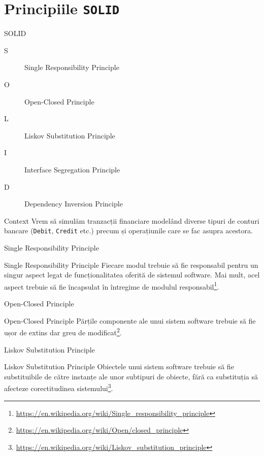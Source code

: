 \documentclass[presentation]{beamer}
\begin{document}
\section{Principiile \texttt{SOLID}}
\label{sec:org23a6d92}
\begin{frame}[label={sec:org90a5503}]{SOLID}
\begin{description}
\item[{S}] Single Responsibility Principle
\item[{O}] Open-Closed Principle
\item[{L}] Liskov Substitution Principle
\item[{I}] Interface Segregation Principle
\item[{D}] Dependency Inversion Principle
\end{description}
\end{frame}
\begin{frame}[label={sec:orgca02fb6},fragile]{Context}
 Vrem să simulăm tranzacții financiare modelând diverse tipuri de conturi bancare (\texttt{Debit}, \texttt{Credit} etc.) precum și operațiunile care se fac asupra acestora.
\end{frame}
\begin{frame}[label={sec:org30d808a}]{Single Responsibility Principle}
\begin{block}{Single Responsibility Principle}
Fiecare modul trebuie să fie responsabil pentru un singur aspect legat de funcționalitatea oferită de sistemul software. Mai mult, acel aspect trebuie să fie încapsulat în întregime de modulul responsabil\footnote{\url{https://en.wikipedia.org/wiki/Single\_responsibility\_principle}}.
\end{block}
\end{frame}
\begin{frame}[label={sec:orgb8ccf3f}]{Open-Closed Principle}
\begin{block}{Open-Closed Principle}
Părțile componente ale unui sistem software trebuie să fie ușor de extins dar greu de modificat\footnote{\url{https://en.wikipedia.org/wiki/Open/closed\_principle}}.
\end{block}
\end{frame}
\begin{frame}[label={sec:org18988f0}]{Liskov Substitution Principle}
\begin{block}{Liskov Substitution Principle}
Obiectele unui sistem software trebuie să fie substituibile de către instanțe ale unor subtipuri de obiecte, fără ca substituția să afecteze corectitudinea sistemului\footnote{\url{https://en.wikipedia.org/wiki/Liskov\_substitution\_principle}}.
\end{block}
\end{frame}
\end{document}
